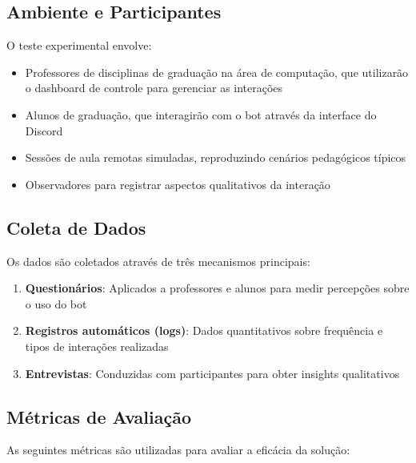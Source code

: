 
\subsection{Ambiente e Participantes}
\label{subsec:ambiente}

O teste experimental envolve:
\begin{itemize}
\item Professores de disciplinas de graduação na área de computação, que utilizarão o dashboard de controle para gerenciar as interações
\item Alunos de graduação, que interagirão com o bot através da interface do Discord
\item Sessões de aula remotas simuladas, reproduzindo cenários pedagógicos típicos
\item Observadores para registrar aspectos qualitativos da interação
\end{itemize}


\subsection{Coleta de Dados}
\label{subsec:coleta}

Os dados são coletados através de três mecanismos principais:

\begin{enumerate}
\item \textbf{Questionários}: Aplicados a professores e alunos para medir percepções sobre o uso do bot
   
\item \textbf{Registros automáticos (logs)}: Dados quantitativos sobre frequência e tipos de interações realizadas

\item \textbf{Entrevistas}: Conduzidas com participantes para obter insights qualitativos
\end{enumerate}


\subsection{Métricas de Avaliação}
\label{subsec:metricas}

As seguintes métricas são utilizadas para avaliar a eficácia da solução:

